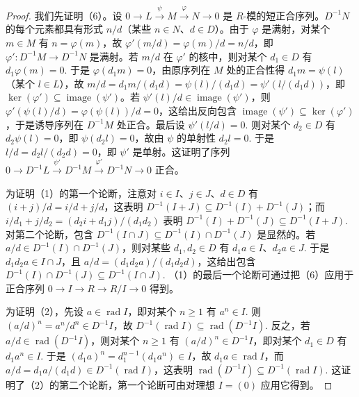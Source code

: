 \begin{proof}
我们先证明（6）。设 \(0 \to L \xrightarrow{\psi} M \xrightarrow{\varphi} N \to 0\) 是 \(R\)-模的短正合序列。\(D^{-1}N\) 的每个元素都具有形式 \(n/d\)（某些 \(n \in N\)、\(d \in D\)）。由于 \(\varphi\) 是满射，对某个 \(m \in M\) 有 \(n = \varphi(m)\)，故 \(\varphi'(m/d) = \varphi(m)/d = n/d\)，即 \(\varphi' : D^{-1}M \to D^{-1}N\) 是满射。若 \(m/d\) 在 \(\varphi'\) 的核中，则对某个 \(d_1 \in D\) 有 \(d_1\varphi(m) = 0\). 于是 \(\varphi(d_1m) = 0\)，由原序列在 \(M\) 处的正合性得 \(d_1m = \psi(l)\)（某个 \(l \in L\)），故 \(m/d = d_1m/(d_1d) = \psi(l)/(d_1d) = \psi'(l/(d_1d))\)，即 \(\ker(\varphi') \subseteq \operatorname{image}(\psi')\)。若 \(\psi'(l)/d \in \operatorname{image}(\psi')\)，则 \(\varphi'(\psi(l)/d) = \varphi(\psi(l))/d = 0\)，这给出反向包含 \(\operatorname{image}(\psi') \subseteq \ker(\varphi')\)，于是诱导序列在 \(D^{-1}M\) 处正合。最后设 \(\psi'(l/d) = 0\). 则对某个 \(d_2 \in D\) 有 \(d_2\psi(l) = 0\)，即 \(\psi(d_2l) = 0\)，故由 \(\psi\) 的单射性 \(d_2l = 0\). 于是 \(l/d = d_2l/(d_2d) = 0\)，即 \(\psi'\) 是单射。这证明了序列 \(0 \to D^{-1}L \xrightarrow{\psi'} D^{-1}M \xrightarrow{\varphi'} D^{-1}N \to 0\) 正合。

为证明（1）的第一个论断，注意对 \(i \in I\)、\(j \in J\)、\(d \in D\) 有 \((i+j)/d = i/d+j/d\)，这表明 \(D^{-1}(I+J) \subseteq D^{-1}(I)+D^{-1}(J)\)；而 \(i/d_1+j/d_2 = (d_2i+d_1j)/(d_1d_2)\) 表明 \(D^{-1}(I)+D^{-1}(J) \subseteq D^{-1}(I+J)\). 对第二个论断，包含 \(D^{-1}(I \cap J) \subseteq D^{-1}(I) \cap D^{-1}(J)\) 是显然的。若 \(a/d \in D^{-1}(I) \cap D^{-1}(J)\)，则对某些 \(d_1, d_2 \in D\) 有 \(d_1a \in I\)、\(d_2a \in J\). 于是 \(d_1d_2a \in I \cap J\)，且 \(a/d = (d_1d_2a)/(d_1d_2d)\)，这给出包含 \(D^{-1}(I) \cap D^{-1}(J) \subseteq D^{-1}(I \cap J)\). （1）的最后一个论断可通过把（6）应用于正合序列 \(0 \to I \to R \to R/I \to 0\) 得到。

为证明（2），先设 \(a \in \operatorname{rad}I\)，即对某个 \(n \geq 1\) 有 \(a^n \in I\). 则 \((a/d)^n = a^n/d^n \in D^{-1}I\)，故 \(D^{-1}(\operatorname{rad}I) \subseteq \operatorname{rad}(D^{-1}I)\). 反之，若 \(a/d \in \operatorname{rad}(D^{-1}I)\)，则对某个 \(n \geq 1\) 有 \((a/d)^n \in D^{-1}I\)，即对某个 \(d_1 \in D\) 有 \(d_1a^n \in I\). 于是 \((d_1a)^n = d_1^{n-1}(d_1a^n) \in I\)，故 \(d_1a \in \operatorname{rad}I\)，而 \(a/d = d_1a/(d_1d) \in D^{-1}(\operatorname{rad}I)\)，这表明 \(\operatorname{rad}(D^{-1}I) \subseteq D^{-1}(\operatorname{rad}I)\). 这证明了（2）的第二个论断，第一个论断可由对理想 \(I = (0)\) 应用它得到。


\end{proof}
